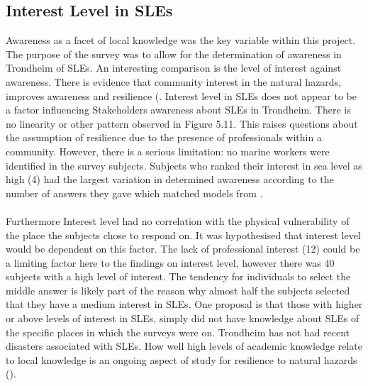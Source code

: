\subsection{Interest Level in SLEs}
Awareness as a facet of local knowledge was the key variable within this project. The purpose of the survey was to allow for the determination of awareness in Trondheim of SLEs. An interesting comparison is the level of interest against awareness. There is evidence that community interest in the natural hazards, improves awareness and resilience (\cite{cutter_community_2020}. Interest level in SLEs does not appear to be a factor influencing Stakeholders awareness about SLEs in Trondheim. There is no linearity or other pattern observed in Figure 5.11. This raises questions about the assumption of resilience due to the presence of professionals within a community. However, there is a serious limitation: no marine workers were identified in the survey subjects. Subjects who ranked their interest in sea level as high (4) had the largest variation in determined awareness according to the number of answers they gave which matched models from \cite{kartverket_se_2020}.
\paragraph{}
Furthermore Interest level had no correlation with the physical vulnerability of the place the subjects chose to respond on. It was hypothesised that interest level would be dependent on this factor. The lack of professional interest (12) could be a limiting factor here to the findings on interest level, however there was 40 subjects with a high level of interest. The tendency for individuals to select the middle answer is  likely part of the reason why almost half the subjects selected that they have a medium interest in SLEs. One proposal is that those with higher or above levels of interest in SLEs, simply did not have knowledge about SLEs of the specific places in which the surveys were on. Trondheim has not had recent disasters associated with SLEs. How well high levels of academic knowledge relate to local knowledge is an ongoing aspect of study for resilience to natural hazards (\cite{lujala_role_2020}).
\paragraph{}



   

